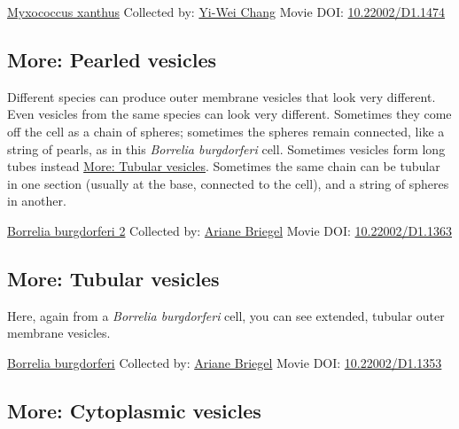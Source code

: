 \documentclass[]{tufte-book}
\begin{document}
\hypertarget{htmlwidget-478f43487be45ee3d44e}{}

\label{fig:2-4}\protect\hyperlink{tree}{Myxococcus xanthus} Collected by: \protect\hyperlink{yi-wei_chang}{Yi-Wei Chang} Movie DOI: \href{https://doi.org/10.22002/D1.1474}{10.22002/D1.1474}

\hypertarget{Pearled_vesicles}{%
\subsection*{More: Pearled vesicles}\label{Pearled_vesicles}}

Different species can produce outer membrane vesicles that look very different. Even vesicles from the same species can look very different. Sometimes they come off the cell as a chain of spheres; sometimes the spheres remain connected, like a string of pearls, as in this \emph{Borrelia burgdorferi} cell. Sometimes vesicles form long tubes instead \protect\hyperlink{Tubular_vesicles}{More: Tubular vesicles}. Sometimes the same chain can be tubular in one section (usually at the base, connected to the cell), and a string of spheres in another.



\hypertarget{htmlwidget-123ea9d23158f53577b0}{}

\label{fig:2-4a}\protect\hyperlink{tree}{Borrelia burgdorferi 2} Collected by: \protect\hyperlink{ariane_briegel}{Ariane Briegel} Movie DOI: \href{https://doi.org/10.22002/D1.1363}{10.22002/D1.1363}

\hypertarget{Tubular_vesicles}{%
\subsection*{More: Tubular vesicles}\label{Tubular_vesicles}}

Here, again from a \emph{Borrelia burgdorferi} cell, you can see extended, tubular outer membrane vesicles.



\hypertarget{htmlwidget-26231ab8607ab6333961}{}

\label{fig:2-4b}\protect\hyperlink{tree}{Borrelia burgdorferi} Collected by: \protect\hyperlink{ariane_briegel}{Ariane Briegel} Movie DOI: \href{https://doi.org/10.22002/D1.1353}{10.22002/D1.1353}

\hypertarget{Cytoplasmic_vesicles}{%
\subsection*{More: Cytoplasmic vesicles}\label{Cytoplasmic_vesicles}}
\end{document}
